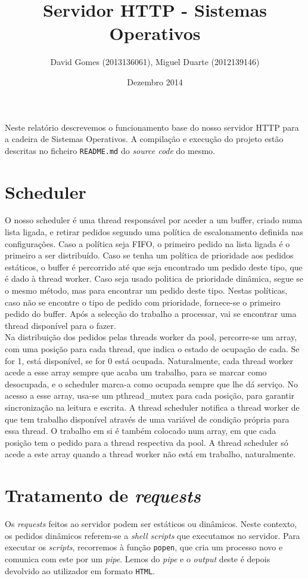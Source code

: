 \documentclass[12pt]{article}
\title{Servidor HTTP - Sistemas Operativos}
\author{David Gomes (2013136061), Miguel Duarte (2012139146)}
\date{Dezembro 2014}
\begin{document}
\maketitle

Neste relatório descrevemos o funcionamento base do nosso servidor HTTP
para a cadeira de Sistemas Operativos. A compilação e execução do projeto
estão descritas no ficheiro \texttt{README.md} do \textit{source code} do
mesmo.

\section{Scheduler}
O nosso scheduler é uma thread responsável por aceder a um buffer, criado numa lista ligada, e retirar pedidos segundo uma política de escalonamento definida nas configurações. Caso a política seja FIFO, o primeiro pedido na lista ligada é o primeiro a ser distribuído. Caso se tenha um política de prioridade aos pedidos estáticos, o buffer é percorrido até que seja encontrado um pedido deste tipo, que é dado à thread worker. Caso seja usado politica de prioridade dinâmica, segue se o mesmo método, mas para encontrar um pedido deste tipo. Nestas políticas, caso não se encontre o tipo de pedido com prioridade, fornece-se o primeiro pedido do buffer. Após a selecção do trabalho a processar, vai se encontrar uma thread disponível para o fazer.\\
Na distribuição dos pedidos pelas threads worker da pool, percorre-se um array, com uma posição para cada thread, que indica o estado de ocupação de cada. Se for 1, está disponível, se for 0 está ocupada. Naturalmente, cada thread worker acede a esse array sempre que acaba um trabalho, para se marcar como desocupada, e o scheduler marca-a como ocupada sempre que lhe dá serviço. No acesso a esse array, usa-se um pthread_mutex para cada posição, para garantir sincronização na leitura e escrita. A thread scheduler notifica a thread worker de que tem trabalho disponível através de uma variável de condição própria para essa thread. O trabalho em si é também colocado num array, em que cada posição tem o pedido para a thread respectiva da pool. A thread scheduler só acede a este array quando a thread worker não está em trabalho, naturalmente.\\

\section{Tratamento de \textit{requests}}
Os \textit{requests} feitos ao servidor podem ser estáticos ou dinâmicos. Neste
contexto, os pedidos dinâmicos referem-se a \textit{shell scripts} que executamos
no servidor. Para executar os \textit{scripts}, recorremos à função
\texttt{popen}, que cria um processo novo e comunica com este por um \textit{pipe}.
Lemos do \textit{pipe} e o \textit{output} deste é depois devolvido ao utilizador
em formato \texttt{HTML}.
\end{document}
